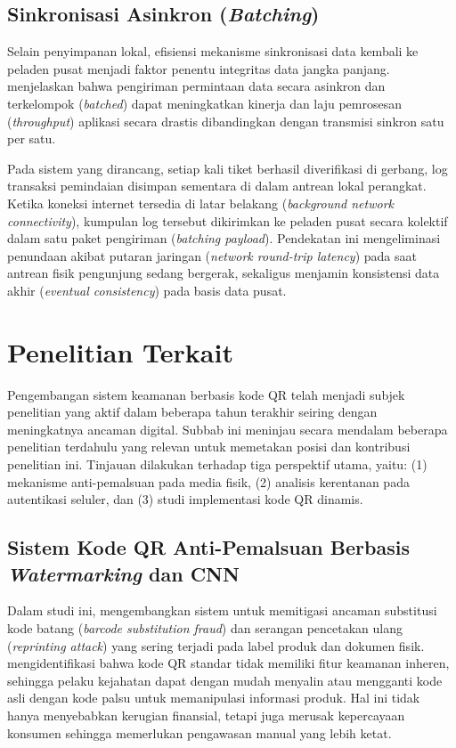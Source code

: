 \subsection{Sinkronisasi Asinkron (\textit{Batching})}
Selain penyimpanan lokal, efisiensi mekanisme sinkronisasi data kembali ke peladen pusat menjadi faktor penentu integritas data jangka panjang. \textcite{ramachandra2015program} menjelaskan bahwa pengiriman permintaan data secara asinkron dan terkelompok (\textit{batched}) dapat meningkatkan kinerja dan laju pemrosesan (\textit{throughput}) aplikasi secara drastis dibandingkan dengan transmisi sinkron satu per satu.

Pada sistem yang dirancang, setiap kali tiket berhasil diverifikasi di gerbang, log transaksi pemindaian disimpan sementara di dalam antrean lokal perangkat. Ketika koneksi internet tersedia di latar belakang (\textit{background network connectivity}), kumpulan log tersebut dikirimkan ke peladen pusat secara kolektif dalam satu paket pengiriman (\textit{batching payload}). Pendekatan ini mengeliminasi penundaan akibat putaran jaringan (\textit{network round-trip latency}) pada saat antrean fisik pengunjung sedang bergerak, sekaligus menjamin konsistensi data akhir (\textit{eventual consistency}) pada basis data pusat.

\section{Penelitian Terkait}
\label{sec:penelitian_terkait}

Pengembangan sistem keamanan berbasis kode QR telah menjadi subjek penelitian yang aktif dalam beberapa tahun terakhir seiring dengan meningkatnya ancaman digital. Subbab ini meninjau secara mendalam beberapa penelitian terdahulu yang relevan untuk memetakan posisi dan kontribusi penelitian ini. Tinjauan dilakukan terhadap tiga perspektif utama, yaitu: (1) mekanisme anti-pemalsuan pada media fisik, (2) analisis kerentanan pada autentikasi seluler, dan (3) studi implementasi kode QR dinamis.

\subsection{Sistem Kode QR Anti-Pemalsuan Berbasis \textit{Watermarking} dan CNN}
Dalam studi ini, \textcite{alsuhibany2025innovative} mengembangkan sistem untuk memitigasi ancaman substitusi kode batang (\textit{barcode substitution fraud}) dan serangan pencetakan ulang (\textit{reprinting attack}) yang sering terjadi pada label produk dan dokumen fisik. \textcite{alsuhibany2025innovative} mengidentifikasi bahwa kode QR standar tidak memiliki fitur keamanan inheren, sehingga pelaku kejahatan dapat dengan mudah menyalin atau mengganti kode asli dengan kode palsu untuk memanipulasi informasi produk. Hal ini tidak hanya menyebabkan kerugian finansial, tetapi juga merusak kepercayaan konsumen sehingga memerlukan pengawasan manual yang lebih ketat.

